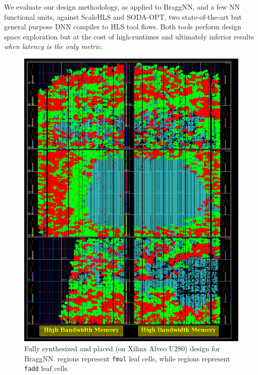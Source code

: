 We evaluate our design methodology, as applied to BraggNN, and a few NN functional units, against ScaleHLS\cite{ye2021scalehls} and SODA-OPT\cite{9516615}, two state-of-the-art but general purpose DNN compiler to HLS tool flows.
Both tools perform design space exploration but at the cost of high-runtimes and ultimately inferior results \emph{when latency is the only metric}.


\begin{figure}
	\includegraphics[width=\columnwidth]{figures/placed_braggnn.png}
	\caption{Fully synthesized and placed (on Xilinx Alveo U280) design for BraggNN. \crule[red]{0.25cm}{0.25cm} regions represent \texttt{fmul} leaf cells, while \crule[green]{0.25cm}{0.25cm} regions represent \texttt{fadd} leaf cells.}\label{fig:placed_braggnn}
\end{figure}